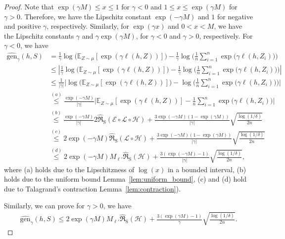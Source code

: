 \documentclass{article}
\theoremstyle{plain}
\theoremstyle{plain}
\theoremstyle{definition}
\theoremstyle{remark}
\newcommand{\LA}{h}
\newcommand{\mbE}{\mathbb{E}}
\begin{document}
\begin{proof}
Note that %
$\exp(\gamma M)\leq x\leq 1$ for $\gamma<0$ and $1\leq x\leq \exp(\gamma M)$ for $\gamma>0$. Therefore, we have the Lipschitz constant $\exp(-\gamma M)$ and $1$ for negative and positive $\gamma$, respectively. Similarly, for $\exp(\gamma x)$ and $0<x< M$, we have the Lipschitz constants $\gamma$ and $\gamma\exp(\gamma M)$, for $\gamma<0$ and $\gamma>0$, respectively. For $\gamma<0$, we have 
    \begin{equation}
        \begin{split}
            \widehat{\mathrm{gen}}_{\gamma}(h,S) 
            &=\frac{1}{\gamma}\log\big(\mbE_{Z\sim\mu}[\exp(\gamma\ell(h,Z))]\big)-\frac{1}{\gamma}\log\Big(\frac{1}{n}\sum_{i=1}^n \exp\big(\gamma\ell(\LA,Z_i)\big)\Big)\\
            &\leq |\frac{1}{\gamma}\log\big(\mbE_{Z\sim\mu}[\exp(\gamma\ell(h,Z))]\big)-\frac{1}{\gamma}\log\Big(\frac{1}{n}\sum_{i=1}^n \exp\big(\gamma\ell(\LA,Z_i)\big)\Big)|\\
            &\leq  \frac{1}{|\gamma|}\Big|\log\big(\mbE_{Z\sim\mu}[\exp(\gamma\ell(h,Z))]\big)-\log\bigg(\frac{1}{n}\sum_{i=1}^n \exp\big(\gamma\ell(\LA,Z_i)\big)\bigg)\Big|\\
            &\overset{(a)}{\leq} \frac{\exp(-\gamma M)}{|\gamma|}\Big|\mbE_{Z\sim\mu}[\exp(\gamma\ell(h,Z))]-\frac{1}{n}\sum_{i=1}^n \exp\big(\gamma\ell(h,Z_i)\big)\Big|\\
             &\overset{(b)}{\leq} \frac{\exp(-\gamma M)}{|\gamma|}2\hat{\mathfrak{R}}_{\mathrm{S}}(\mathcal{E \circ L \circ H})+  \frac{3\exp(-\gamma M)(1-\exp(\gamma M))}{|\gamma|} \sqrt{\frac{\log(1/\delta)}{2n}}\\
             &\overset{(c)}{\leq} 2\exp(-\gamma M)\hat{\mathfrak{R}}_{\mathrm{S}}(\mathcal{L \circ H})+  \frac{3\exp(-\gamma M)(1-\exp(\gamma M))}{|\gamma|} \sqrt{\frac{\log(1/\delta)}{2n}}\\
             &\overset{(d)}{\leq} 2\exp(-\gamma M)M_{\ell'}\hat{\mathfrak{R}}_{\mathrm{S}}(\mathcal{ H})+  \frac{3(\exp(-\gamma M)-1)}{|\gamma|} \sqrt{\frac{\log(1/\delta)}{2n}},
        \end{split}
    \end{equation}
    where (a) holds  due to the Lipschitzness of $\log(x)$ in a bounded interval, (b) holds due to  the uniform bound Lemma~\ref{lem:uniform_bound}, (c) and (d) hold due to Talagrand's contraction Lemma~\ref{lem:contraction}). 
    
    Similarly, we can prove for $\gamma>0$, we have 
        \begin{equation}
        \begin{split}
            \widehat{\mathrm{gen}}_{\gamma}(h,S)
            \leq 2\exp(\gamma M)M_{\ell'}\hat{\mathfrak{R}}_{\mathrm{S}}(\mathcal{ H})+  \frac{3(\exp(\gamma M)-1)}{\gamma} \sqrt{\frac{\log(1/\delta)}{2n}}.
             \end{split}
    \end{equation}
\end{proof}
\end{document}
